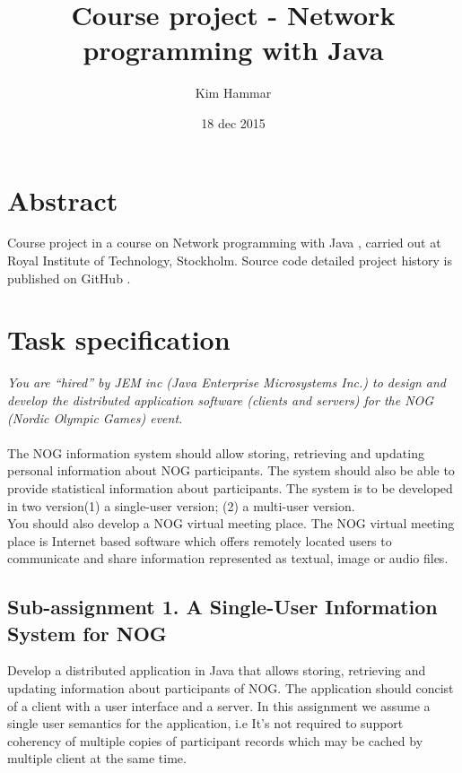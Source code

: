\documentclass[a4paper, 11pt]{article}
\title{Course project - Network programming with Java}
\author{Kim Hammar}
\date{18 dec 2015}
\begin{document}
\maketitle
\thispagestyle{empty}
\begin{versionhistory}
\end{versionhistory}
\newpage
\tableofcontents
\newpage

\section{Abstract}
Course project in a course on Network programming with Java \citep{kth_1}, carried out at Royal Institute of Technology, Stockholm. Source code detailed project history is published on GitHub \citep{kim_1}.
\newpage
\section{Task specification}
\textit{You are ``hired'' by JEM inc (Java Enterprise Microsystems Inc.) to design and develop the distributed application software (clients and servers) for the NOG (Nordic Olympic Games) event.} \\ \\
The NOG information system should allow storing, retrieving and updating personal information about NOG participants. The system should also be able to provide statistical information about participants. The system is to be developed in two version(1) a single-user version; (2) a multi-user version. \\ 
You should also develop a NOG virtual meeting place. The NOG virtual meeting place is Internet based software which offers remotely located users to communicate and share information represented as textual, image or audio files. 
\subsection{Sub-assignment 1. A Single-User Information System for NOG}
Develop a distributed application in Java that allows storing, retrieving and updating information about participants of NOG. The application should concist of a client with a user interface and a server. In this assignment we assume a single user semantics for the application, i.e It's not required to support coherency of multiple copies of participant records which may be cached by multiple client at the same time.
\end{document}
